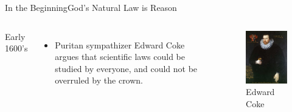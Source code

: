 \begin{frame}{In the Beginning}{God's Natural Law is Reason}
	\begin{columns}[T]
			Early 1600's
			\begin{itemize}
				\item Puritan sympathizer Edward Coke argues that scientific laws could be studied by everyone, and could not be overruled by the crown.
			\end{itemize}
			\begin{figure}
				\centering
				\includegraphics[width=\textwidth]{images/edward_coke}
				\caption{Edward Coke}
			\end{figure}
	\end{columns}
\end{frame}

